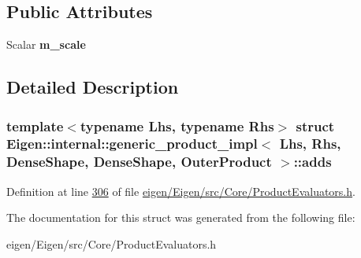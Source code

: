 \subsection*{Public Attributes}
\begin{DoxyCompactItemize}
\item 
\mbox{\label{struct_eigen_1_1internal_1_1generic__product__impl_3_01_lhs_00_01_rhs_00_01_dense_shape_00_01_de79c82097ad07c840c671e4414c434d06_a7a2805c8a5978b643f3e808f583e6aa2}} 
Scalar {\bfseries m\+\_\+scale}
\end{DoxyCompactItemize}


\subsection{Detailed Description}
\subsubsection*{template$<$typename Lhs, typename Rhs$>$\newline
struct Eigen\+::internal\+::generic\+\_\+product\+\_\+impl$<$ Lhs, Rhs, Dense\+Shape, Dense\+Shape, Outer\+Product $>$\+::adds}



Definition at line \hyperlink{eigen_2_eigen_2src_2_core_2_product_evaluators_8h_source_l00306}{306} of file \hyperlink{eigen_2_eigen_2src_2_core_2_product_evaluators_8h_source}{eigen/\+Eigen/src/\+Core/\+Product\+Evaluators.\+h}.



The documentation for this struct was generated from the following file\+:\begin{DoxyCompactItemize}
\item 
eigen/\+Eigen/src/\+Core/\+Product\+Evaluators.\+h\end{DoxyCompactItemize}
